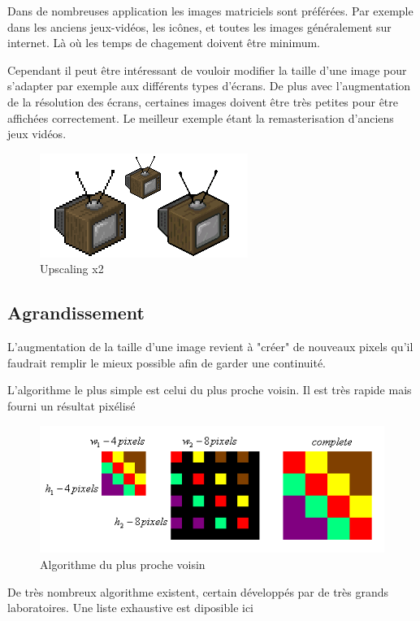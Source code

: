 \documentclass[12pt, a4paper]{article}
\begin{document}
Dans de nombreuses application les images matriciels sont préférées. Par exemple dans les anciens jeux-vidéos, les icônes, et toutes les images généralement sur internet. Là où les temps de chagement doivent être minimum.

Cependant il peut être intéressant de vouloir modifier la taille d'une image pour s'adapter par exemple aux différents types d'écrans. De plus avec l'augmentation de la résolution des écrans, certaines images doivent être très petites pour être affichées correctement. Le meilleur exemple étant la remasterisation d'anciens jeux vidéos.

\begin{figure}[h!]
  \centering
  \includegraphics[scale=0.7]{Images/tele.png}
  \caption{Upscaling x2}
\end{figure}

\subsection{Agrandissement}
 
L'augmentation de la taille d'une image revient à "créer" de nouveaux pixels qu'il faudrait remplir le mieux possible afin de garder une continuité.

L'algorithme le plus simple est celui du plus proche voisin. Il est très rapide mais fourni un résultat pixélisé 

\begin{figure}[h!]
  \centering
  \includegraphics[scale=0.6]{Images/plus_proche_voisin.png}
  \caption{Algorithme du plus proche voisin}
\end{figure}

De très nombreux algorithme existent, certain développés par de très grands laboratoires. Une liste exhaustive est diposible ici
\end{document}
